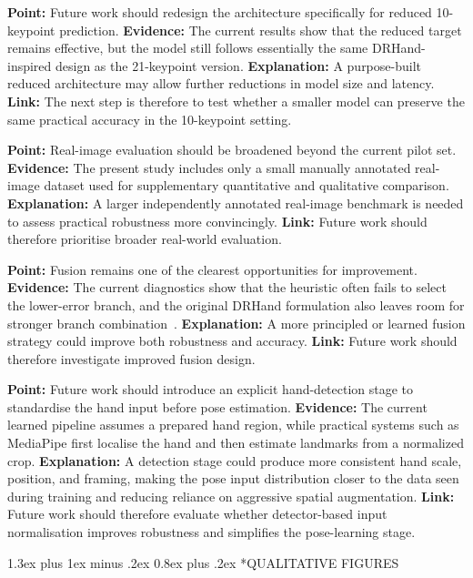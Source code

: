 \documentclass[10pt,letterpaper]{article}
\makeatletter
\renewcommand\section{\@startsection{section}{1}{\z@}%
  {1.3ex plus 1ex minus .2ex}%
  {0.8ex plus .2ex}%
  {\centering\normalfont\small\scshape}}
\makeatother
\begin{document}
\medskip
\noindent\textbf{Point:} Future work should redesign the architecture specifically for reduced 10-keypoint prediction.
\textbf{Evidence:} The current results show that the reduced target remains effective, but the model still follows essentially the same DRHand-inspired design as the 21-keypoint version.
\textbf{Explanation:} A purpose-built reduced architecture may allow further reductions in model size and latency.
\textbf{Link:} The next step is therefore to test whether a smaller model can preserve the same practical accuracy in the 10-keypoint setting.

\medskip
\noindent\textbf{Point:} Real-image evaluation should be broadened beyond the current pilot set.
\textbf{Evidence:} The present study includes only a small manually annotated real-image dataset used for supplementary quantitative and qualitative comparison.
\textbf{Explanation:} A larger independently annotated real-image benchmark is needed to assess practical robustness more convincingly.
\textbf{Link:} Future work should therefore prioritise broader real-world evaluation.

\medskip
\noindent\textbf{Point:} Fusion remains one of the clearest opportunities for improvement.
\textbf{Evidence:} The current diagnostics show that the heuristic often fails to select the lower-error branch, and the original DRHand formulation also leaves room for stronger branch combination~\cite{dualreg}.
\textbf{Explanation:} A more principled or learned fusion strategy could improve both robustness and accuracy.
\textbf{Link:} Future work should therefore investigate improved fusion design.

\medskip
\noindent\textbf{Point:} Future work should introduce an explicit hand-detection stage to standardise the hand input before pose estimation.
\textbf{Evidence:} The current learned pipeline assumes a prepared hand region, while practical systems such as MediaPipe first localise the hand and then estimate landmarks from a normalized crop.
\textbf{Explanation:} A detection stage could produce more consistent hand scale, position, and framing, making the pose input distribution closer to the data seen during training and reducing reliance on aggressive spatial augmentation.
\textbf{Link:} Future work should therefore evaluate whether detector-based input normalisation improves robustness and simplifies the pose-learning stage.

\clearpage
\onecolumn
\section*{QUALITATIVE FIGURES}
\end{document}
